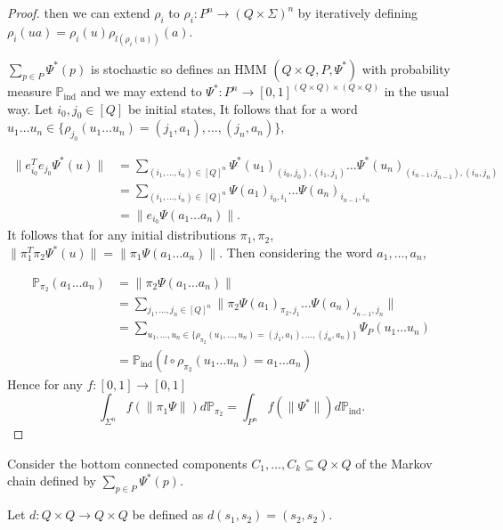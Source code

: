 \documentclass[a4paper,UKenglish,cleveref, autoref,mathscr]{lipics-v2019}
\newcommand{\PP}{\mathbb{P}}
\newcommand{\1}{\mathbbm{1}}
\begin{document}
\begin{proof}
then we can extend $\rho_i$ to $\rho_i : P^n \rightarrow (Q \times \Sigma)^n$ by iteratively defining $\rho_i(ua) = \rho_i(u) \rho_{l(\rho_i(u))}(a)$. 

$\sum_{p \in P}\Psi^*(p)$ is stochastic so defines an HMM $(Q \times Q, P, \Psi^*)$ with probability measure $\PP_{\text{ind}}$ and we may extend to $\Psi^* : P^n \rightarrow [0,1]^{(Q \times Q) \times (Q \times Q)}$ in the usual way. Let  $i_0, j_0 \in [Q]$ be initial states, It follows that for a word $u_1 \dots u_n \in \{\rho_{j_0}(u_1 \dots u_n) = (j_1, a_1), \dots, (j_n, a_n)\}$,

\begin{align*}
\| e_{i_0}^T e_{j_0} \Psi^*(u) \| & = \sum_{(i_1, \dots, i_n) \in [Q]^n} \Psi^*(u_1)_{(i_0, j_0),(i_1,j_1)} \dots \Psi^*(u_n)_{(i_{n - 1}, j_{n - 1}),(i_n,j_n)}\\
& = \sum_{(i_1, \dots, i_n) \in [Q]^n} \Psi(a_1)_{i_0, i_1} \dots \Psi(a_n)_{i_{n - 1}, i_n}\\
& = \| e_{i_0} \Psi(a_1 \dots a_n) \|.
\end{align*}
It follows that for any initial distributions $\pi_1, \pi_2$, $\| \pi_1^T \pi_2 \Psi^*(u) \| = \| \pi_1 \Psi(a_1 \dots a_n) \|$. Then considering the word $a_1, \dots, a_n$, 

\begin{align*}
\PP_{\pi_2}(a_1 \dots a_n) & =\|\pi_2\Psi(a_1 \dots a_n)\| \\
& = \sum_{j_1, \dots, j_n \in [Q]^n}\|\pi_2\Psi(a_1)_{\pi_2, j_1} \dots \Psi(a_n)_{j_{n - 1}, j_n}\|\\
& = \sum_{u_1, \dots, u_n \in \{\rho_{\pi_2}(u_1, \dots, u_n) = (j_1, a_1), \dots, (j_n, a_n)\}} \Psi_P(u_1 \dots u_n)\\
& = \PP_{\text{ind}}(l \circ \rho_{\pi_2}(u_1 \dots u_n) = a_1 \dots a_n)
\end{align*}
Hence for any $f : [0,1] \rightarrow [0,1]$
\begin{equation*}
\int_{\Sigma^n} f(\|\pi_1 \Psi \|) d\PP_{\pi_2} = \int_{P^n} f(\| \Psi^* \|) d\PP_{\text{ind}}.
\end{equation*}
\end{proof}


Consider the bottom connected components $C_1, \dots, C_k \subseteq Q \times Q$ of the Markov chain defined by $\sum_{p \in P} \Psi^*(p)$. 

Let $d : Q \times Q \rightarrow Q \times Q$ be defined as $d(s_1, s_2) = (s_2, s_2)$.
\end{document}
